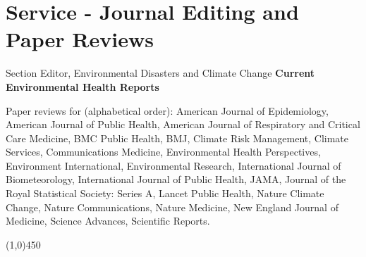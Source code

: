 \section*{Service - Journal Editing and Paper Reviews}

\noindent Section Editor, Environmental Disasters and Climate Change \hfill \textbf{Current Environmental Health Reports} \medskip

\noindent Paper reviews for (alphabetical order): American Journal of Epidemiology, American Journal of Public Health, American Journal of Respiratory and Critical Care Medicine, BMC Public Health, BMJ, Climate Risk Management, Climate Services, Communications Medicine, Environmental Health Perspectives, Environment International, Environmental Research, International Journal of Biometeorology, International Journal of Public Health, JAMA, Journal of the Royal Statistical Society: Series A, Lancet Public Health, Nature Climate Change, Nature Communications, Nature Medicine, New England Journal of Medicine, Science Advances, Scientific Reports.

\begin{center} \line(1,0){450} \end{center}